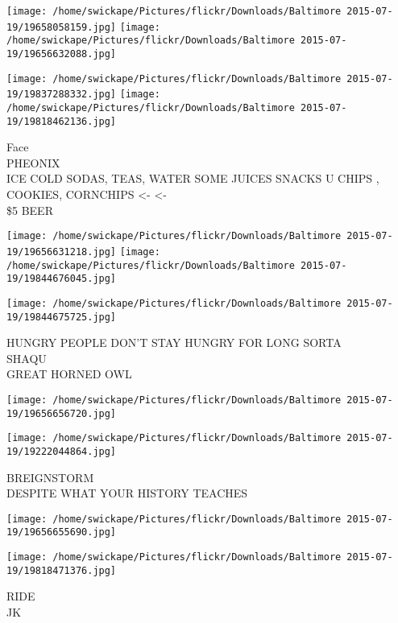 \documentclass[10pt,letterpaper]{article}
\begin{document}
\texttt{[image: /home/swickape/Pictures/flickr/Downloads/Baltimore 2015-07-19/19658058159.jpg]}
\texttt{[image: /home/swickape/Pictures/flickr/Downloads/Baltimore 2015-07-19/19656632088.jpg]}

\texttt{[image: /home/swickape/Pictures/flickr/Downloads/Baltimore 2015-07-19/19837288332.jpg]}
\texttt{[image: /home/swickape/Pictures/flickr/Downloads/Baltimore 2015-07-19/19818462136.jpg]}

Face\\
PHEONIX\\
ICE COLD SODAS, TEAS, WATER SOME JUICES SNACKS U CHIPS , COOKIES, CORNCHIPS <{-} <{-}\\
\$5 BEER\\
\pagebreak

\texttt{[image: /home/swickape/Pictures/flickr/Downloads/Baltimore 2015-07-19/19656631218.jpg]}
\texttt{[image: /home/swickape/Pictures/flickr/Downloads/Baltimore 2015-07-19/19844676045.jpg]}

\vspace{0.25in}
\texttt{[image: /home/swickape/Pictures/flickr/Downloads/Baltimore 2015-07-19/19844675725.jpg]}

HUNGRY PEOPLE DON'T STAY HUNGRY FOR LONG SORTA\\
SHAQU\\
GREAT HORNED OWL\\
\pagebreak

\texttt{[image: /home/swickape/Pictures/flickr/Downloads/Baltimore 2015-07-19/19656656720.jpg]}

\vspace{0.25in}
\texttt{[image: /home/swickape/Pictures/flickr/Downloads/Baltimore 2015-07-19/19222044864.jpg]}

BREIGNSTORM\\
DESPITE WHAT YOUR HISTORY TEACHES\\
\pagebreak

\texttt{[image: /home/swickape/Pictures/flickr/Downloads/Baltimore 2015-07-19/19656655690.jpg]}

\vspace{0.25in}
\texttt{[image: /home/swickape/Pictures/flickr/Downloads/Baltimore 2015-07-19/19818471376.jpg]}

RIDE\\
JK\\
\pagebreak
\end{document}
